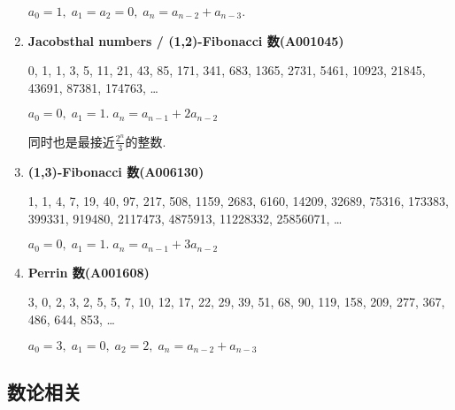 \begin{enumerate}
          \(a_0 = 1,\; a_1 = a_2 = 0,\; a_n = a_{n - 2} + a_{n - 3}\).

    \item \textbf{Jacobsthal numbers / (1,2)-Fibonacci 数(A001045)}

          0, 1, 1, 3, 5, 11, 21, 43, 85, 171, 341, 683, 1365, 2731, 5461, 10923, 21845, 43691, 87381, 174763, \dots

          \( a_0 = 0,\; a_1 = 1.\; a_n = a_{n - 1} + 2a_{n - 2} \)

          同时也是最接近\(\frac {2 ^ n} 3\)的整数.

    \item \textbf{(1,3)-Fibonacci 数(A006130)}

          1, 1, 4, 7, 19, 40, 97, 217, 508, 1159, 2683, 6160, 14209, 32689, 75316, 173383, 399331, 919480, 2117473, 4875913, 11228332, 25856071, \dots

          \( a_0 = 0,\; a_1 = 1.\; a_n = a_{n - 1} + 3a_{n - 2} \)

    \item \textbf{Perrin 数(A001608)}

          3, 0, 2, 3, 2, 5, 5, 7, 10, 12, 17, 22, 29, 39, 51, 68, 90, 119, 158, 209, 277, 367, 486, 644, 853, \dots

          \( a_0 = 3,\; a_1 = 0,\; a_2 = 2,\; a_n = a_{n - 2} + a_{n - 3} \)
\end{enumerate}

\subsection{数论相关}

